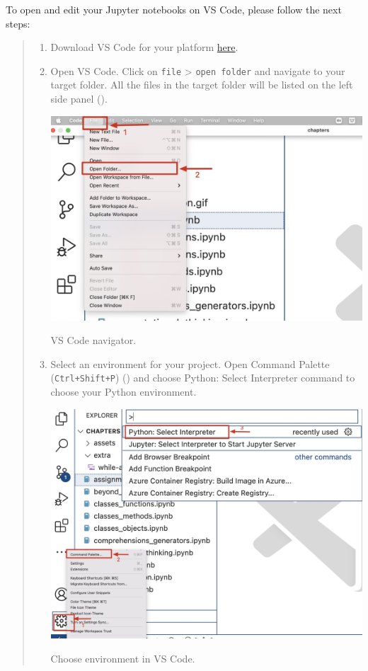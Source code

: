 \documentclass{latex-template/tufte-handout}
\begin{document}
To open and edit your Jupyter notebooks on VS Code, please follow the next steps:
\begin{quote}
\begin{enumerate}
\def\labelenumi{\arabic{enumi}.}
\item Download VS Code for your platform \href{https://code.visualstudio.com/Download}{here}.
\item Open VS Code. Click on \texttt{file} > \texttt{open folder} and navigate to your target folder. All the files in the target folder will be listed on the left side panel ().
    \begin{marginfigure}%
      \includegraphics[width=1.0\linewidth]{assets/07-openfile-vscode.jpg}
      \caption{VS Code navigator.}
      \label{fig:vscode-navigator}
    \end{marginfigure}
\item Select an environment for your project. Open Command Palette (\texttt{Ctrl+Shift+P}) () and choose Python: Select Interpreter command to choose your Python environment.
    \begin{marginfigure}%
      \includegraphics[width=1.2\linewidth]{assets/08-choose-env-vscode.jpg}
      \caption{Choose environment in VS Code.}
      \label{fig:environment-vscode}
    \end{marginfigure}



\end{enumerate}
\end{quote}
\end{document}
